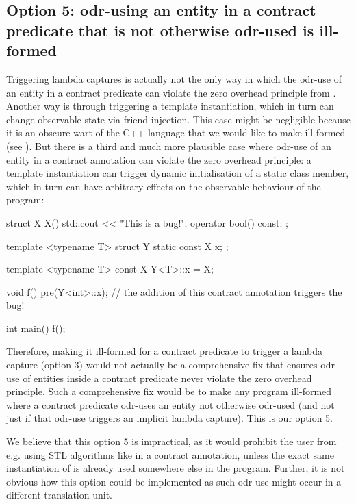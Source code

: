 \subsection*{Option 5: odr-using an entity in a contract predicate that is not otherwise odr-used is ill-formed}

Triggering lambda captures is actually not the only way in which the odr-use of an entity in a contract predicate can violate the zero overhead principle from \cite{P2932R2}. Another way is through triggering a template instantiation, which in turn can change observable state via friend injection. This case might be negligible because it is an obscure wart of the C++ language that we would like to make ill-formed (see \cite{CWG2118}). But there is a third and much more plausible case where odr-use of an entity in a contract annotation can violate the zero overhead principle: a template instantiation can trigger dynamic initialisation of a static class member, which in turn can have arbitrary effects on the observable behaviour of the program:

\begin{codeblock}
struct X {
  X() { std::cout << "This is a bug!\n"; }
  operator bool() const;
};

template <typename T>
struct Y {
  static const X x;
};

template <typename T>
const X Y<T>::x = X{};

void f()
  pre(Y<int>::x);  // the addition of this contract annotation triggers the bug!

int main() {
  f(); 
}
\end{codeblock}

Therefore, making it ill-formed for a contract predicate to trigger a lambda capture (option 3) would not actually be a comprehensive fix that ensures odr-use of entities inside a contract predicate never violate the zero overhead principle. Such a comprehensive fix would be to make any program ill-formed where a contract predicate odr-uses an entity not otherwise odr-used (and not just if that odr-use triggers an implicit lambda capture). This is our option 5.

We believe that this option 5 is impractical, as it would prohibit the user from e.g. using STL algorithms like  in a contract annotation, unless the exact same instantiation of \mbox{} is already used somewhere else in the program. Further, it is not obvious how this option could be implemented as such odr-use might occur in a different translation unit.

